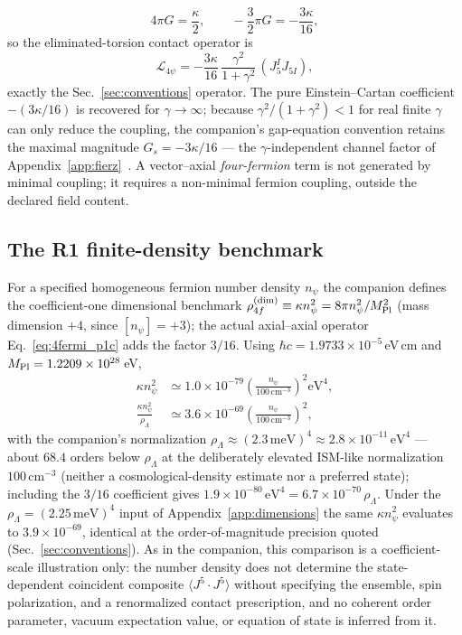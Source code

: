 \documentclass[aps,prd,twocolumn,superscriptaddress,showpacs,preprintnumbers,nofootinbib,longbibliography,floatfix]{revtex4-2}
\newcommand{\MPl}{M_{\rm Pl}}
\begin{document}
\begin{equation}\label{eq:fmt_bridge_p1c}
4\pi G=\frac{\kappa}{2},\qquad
-\frac{3}{2}\pi G=-\frac{3\kappa}{16},
\end{equation}
so the eliminated-torsion contact operator is
\begin{equation}\label{eq:4fermi_p1c}
\mathcal L_{4\psi}=-\frac{3\kappa}{16}\,
\frac{\gamma^2}{1+\gamma^2}\,(J_5^I J_{5I}),
\end{equation}
exactly the Sec.~\ref{sec:conventions} operator. The pure
Einstein--Cartan coefficient $-(3\kappa/16)$ is recovered for
$\gamma\to\infty$; because $\gamma^2/(1+\gamma^2)<1$ for real finite
$\gamma$ can only reduce the coupling, the companion's gap-equation
convention retains the maximal magnitude $G_s=-3\kappa/16$ --- the
$\gamma$-independent channel factor of
Appendix~\ref{app:fierz}~\cite{Golden2026P1a}. A vector--axial
\emph{four-fermion} term is
not generated by minimal coupling; it requires a non-minimal fermion
coupling, outside the declared field content.

\subsection{The R1 finite-density benchmark}\label{app:r1_benchmark}

For a specified homogeneous fermion number density $n_\psi$ the
companion defines the coefficient-one dimensional benchmark
$\rho_{4f}^{(\rm dim)}\equiv\kappa n_\psi^2=8\pi n_\psi^2/\MPl^2$
(mass dimension $+4$, since $[n_\psi]=+3$); the actual axial--axial
operator Eq.~\eqref{eq:4fermi_p1c} adds the factor $3/16$. Using
$\hbar c=1.9733\times10^{-5}\,$eV\,cm and
$\MPl=1.2209\times10^{28}\,$eV,
\begin{align}\label{eq:r1_benchmark_p1c}
\kappa n_\psi^2 &\simeq 1.0\times10^{-79}
\left(\frac{n_\psi}{100\,\mathrm{cm}^{-3}}\right)^2\!\mathrm{eV}^4,
\nonumber\\
\frac{\kappa n_\psi^2}{\rho_\Lambda}&\simeq3.6\times10^{-69}
\left(\frac{n_\psi}{100\,\mathrm{cm}^{-3}}\right)^2,
\end{align}
with the companion's normalization
$\rho_\Lambda\approx(2.3\,\text{meV})^4\approx2.8\times10^{-11}\,
\text{eV}^4$ --- about $68.4$ orders below $\rho_\Lambda$ at the
deliberately elevated ISM-like normalization $100\,\mathrm{cm}^{-3}$
(neither a cosmological-density estimate nor a preferred state);
including the $3/16$ coefficient gives
$1.9\times10^{-80}\,\text{eV}^4=6.7\times10^{-70}\,\rho_\Lambda$.
Under the $\rho_\Lambda=(2.25\,\text{meV})^4$ input of
Appendix~\ref{app:dimensions} the same $\kappa n_\psi^2$ evaluates to
$3.9\times10^{-69}$, identical at the order-of-magnitude precision
quoted (Sec.~\ref{sec:conventions}). As in the companion, this
comparison is a coefficient-scale illustration only: the number density
does not determine the state-dependent coincident composite
$\langle J^5\!\cdot\!J^5\rangle$ without specifying the ensemble, spin
polarization, and a renormalized contact prescription, and no coherent
order parameter, vacuum expectation value, or equation of state is
inferred from it.


\end{document}
